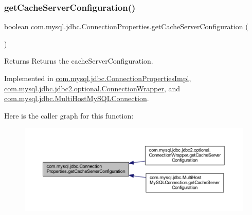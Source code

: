 \subsubsection{\texorpdfstring{get\+Cache\+Server\+Configuration()}{getCacheServerConfiguration()}}
{\footnotesize\ttfamily boolean com.\+mysql.\+jdbc.\+Connection\+Properties.\+get\+Cache\+Server\+Configuration (\begin{DoxyParamCaption}{ }\end{DoxyParamCaption})}

\begin{DoxyReturn}{Returns}
Returns the cache\+Server\+Configuration. 
\end{DoxyReturn}


Implemented in \mbox{\hyperlink{classcom_1_1mysql_1_1jdbc_1_1_connection_properties_impl_ab45617631eabbb28a1d6fb192414b354}{com.\+mysql.\+jdbc.\+Connection\+Properties\+Impl}}, \mbox{\hyperlink{classcom_1_1mysql_1_1jdbc_1_1jdbc2_1_1optional_1_1_connection_wrapper_a3338701a08234fb035685c6e0ce5b77c}{com.\+mysql.\+jdbc.\+jdbc2.\+optional.\+Connection\+Wrapper}}, and \mbox{\hyperlink{classcom_1_1mysql_1_1jdbc_1_1_multi_host_my_s_q_l_connection_aef3695ab6a8b5b8c534fc4020f6d12a4}{com.\+mysql.\+jdbc.\+Multi\+Host\+My\+S\+Q\+L\+Connection}}.

Here is the caller graph for this function\+:\nopagebreak
\begin{figure}[H]
\begin{center}
\leavevmode
\includegraphics[width=350pt]{interfacecom_1_1mysql_1_1jdbc_1_1_connection_properties_a8827c77268d7c5b63d6f225cb955f70c_icgraph}
\end{center}
\end{figure}
\mbox{\label{interfacecom_1_1mysql_1_1jdbc_1_1_connection_properties_a413ae8156c79a09e68023792a88351ac}} 
